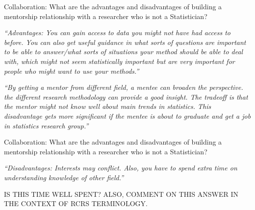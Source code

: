 \documentclass[portrait,11pt]{seminar}
\begin{document}




\bs

  Collaboration: What are the advantages and disadvantages of building a mentorship relationship with a researcher who is not a Statistician?

{\it ``Advantages: You can gain access to data you might not have had access to before. You can also get useful guidance in what sorts of questions are important to be able to answer/what sorts of situations your method should be able to deal with, which might not seem statistically important but are very important for people who might want to use your methods.''}


{\it ``By getting a mentor from different field, a mentee can broaden the 
perspective. the different research methodology can provide a good 
insight. The tradeoff is that the mentor might not know well about main 
trends in statistics. This disadvantage gets more significant if the 
mentee is about to graduate and get a job in statistics research group.''}




\es

\bs

  Collaboration: What are the advantages and disadvantages of building a mentorship relationship with a researcher who is not a Statistician?


{\it ``Disadvantages: Interests may conflict. Also, you have to spend extra time on understanding knowledge of other field.''}

IS THIS TIME WELL SPENT? ALSO, COMMENT ON THIS ANSWER IN THE CONTEXT OF RCRS TERMINOLOGY.

  \es \bs

\end{document}
